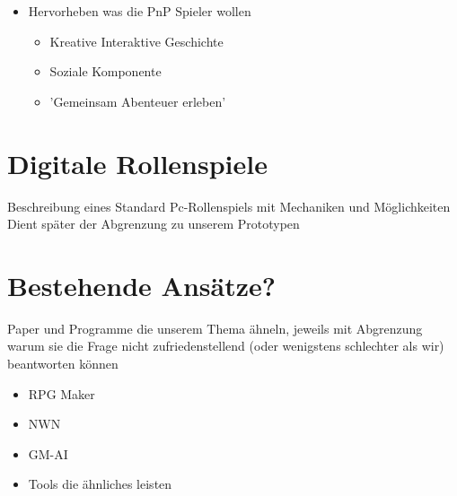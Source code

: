 \begin{itemize}
	\item Hervorheben was die PnP Spieler wollen
	
	\begin{itemize}
		\item Kreative Interaktive Geschichte
		\item Soziale Komponente
		\item 'Gemeinsam Abenteuer erleben'
	\end{itemize}
\end{itemize}


\section{Digitale Rollenspiele}
\label{sec:DigitaleRollenspiele}

Beschreibung eines Standard Pc-Rollenspiels mit Mechaniken und Möglichkeiten\newline
Dient später der Abgrenzung zu unserem Prototypen

\section{Bestehende Ansätze?}
\label{sec:BekannteAnsaetze}
Paper und Programme die unserem Thema ähneln, jeweils mit Abgrenzung warum sie die Frage nicht zufriedenstellend (oder wenigstens schlechter als wir) beantworten können
\begin{itemize}
	\item RPG Maker
	\item NWN
	\item GM-AI
	\item Tools die ähnliches leisten
\end{itemize}